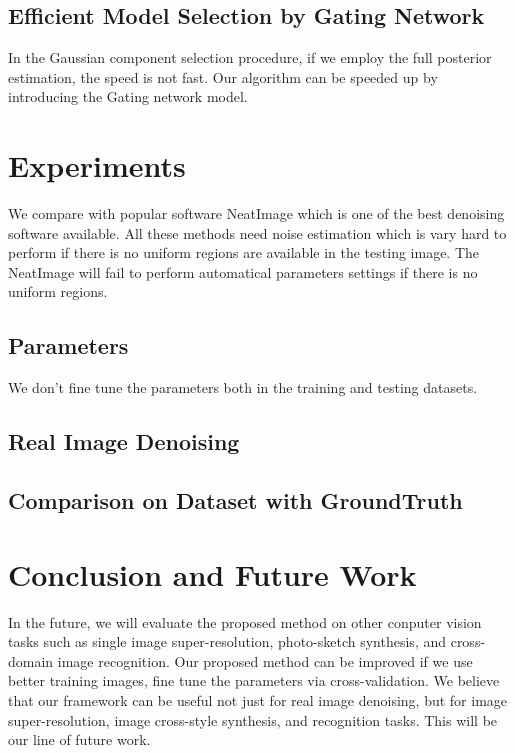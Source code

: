 \documentclass[10pt,twocolumn,letterpaper]{article}
\begin{document}
\subsection{Efficient Model Selection by Gating Network}
In the Gaussian component selection procedure, if we employ the full posterior estimation, the speed is not fast. Our algorithm can be speeded up by introducing the Gating network model.

\section{Experiments}

We compare with popular software NeatImage which is one of the best denoising software available. All these methods need noise estimation which is vary hard to perform if there is no uniform regions are available in the testing image. The NeatImage will fail to perform automatical parameters settings if there is no uniform regions.

\subsection{Parameters}
We don't fine tune the parameters both in the training and testing datasets.

\subsection{Real Image Denoising}


\subsection{Comparison on Dataset with GroundTruth}


\section{Conclusion and Future Work}

In the future, we will evaluate the proposed method on other conputer vision tasks such as single image super-resolution, photo-sketch synthesis, and cross-domain image recognition. Our proposed method can be improved if we use better training images, fine tune the parameters via cross-validation. We believe that our framework can be useful not just for real image denoising, but for image super-resolution, image cross-style synthesis, and recognition tasks. This will be our line of future work.

{\small


}
\end{document}
